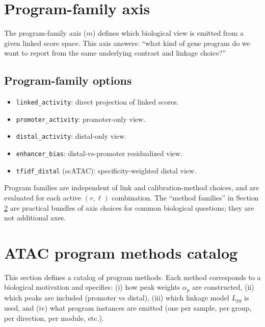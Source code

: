 \documentclass[11pt]{article}
\begin{document}
\section{Program-family axis}
\label{sec:program_axis}
The program-family axis ($m$) defines which biological view is emitted from a given linked score space.
This axis answers: ``what kind of gene program do we want to report from the same underlying contrast and linkage choice?''

\subsection{Program-family options}
\begin{itemize}[leftmargin=2em]
\item \texttt{linked\_activity}: direct projection of linked scores.
\item \texttt{promoter\_activity}: promoter-only view.
\item \texttt{distal\_activity}: distal-only view.
\item \texttt{enhancer\_bias}: distal-vs-promoter residualized view.
\item \texttt{tfidf\_distal} (scATAC): specificity-weighted distal view.
\end{itemize}

Program families are independent of link and calibration-method choices, and are evaluated for each active $(r,\ell)$ combination.
The ``method families'' in Section \ref{sec:program_catalog} are practical bundles of axis choices for common biological questions; they are not additional axes.

\section{ATAC program methods catalog}
\label{sec:program_catalog}
This section defines a catalog of program methods. Each method corresponds to a biological motivation and specifies:
(i) how peak weights $\alpha_p$ are constructed,
(ii) which peaks are included (promoter vs distal),
(iii) which linkage model $L_{pg}$ is used, and
(iv) what program instances are emitted (one per sample, per group, per direction, per module, etc.).
\end{document}
